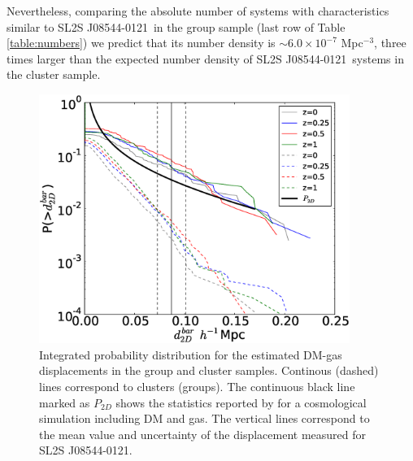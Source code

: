 \documentclass{emulateapj}
\newcommand{\bullg}{SL2S J08544-0121}
\begin{document}
Nevertheless, comparing the absolute number of systems with
characteristics similar to \bullg\ in the group sample
(last row of Table \ref{table:numbers}) we predict that its number
density is $\sim 6.0\times 10^{-7}$ Mpc$^{-3}$, three times larger
than the expected number density of \bullg\ systems in the cluster
sample. 


\begin{figure}
\begin{center}
\includegraphics[width=0.9\textwidth]{figure_3.eps}
\end{center}
\caption{Integrated probability distribution for the estimated
  DM-gas displacements in the group and cluster samples. Continous (dashed)
  lines correspond to clusters (groups). The continuous black line
  marked as $P_{2D}$ shows the statistics reported by
  \citet{ForeroRomero2010} for a cosmological simulation including DM
  and gas. The vertical lines correspond to the mean value and
  uncertainty of the displacement measured for \bullg.} 
\label{fig:baryonic_displacements}
\end{figure}
\end{document}
